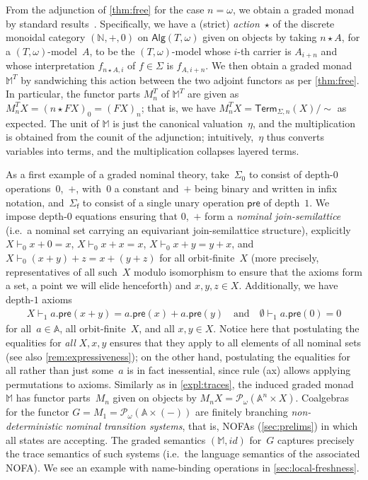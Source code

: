 \documentclass[a4paper,UKenglish,cleveref,thm-restate,numberwithinsect,final]{lipics-v2021}
\newcommand{\pre}{\mathsf{pre}}
\newcommand{\Alg}{\mathsf{Alg}}
\newcommand{\Term}{\mathsf{Term}}
\newcommand{\sig}{\Sigma}
\newcommand{\sigp}{\Sigma_0}
\newcommand{\sigf}{\Sigma_{\mathsf f}}
\newcommand{\Names}{\mathbb{A}}
\newcommand{\pow}{\mathcal{P}}
\newcommand{\powf}{\pow_{\omega}}
\theoremstyle{plain}
\newcommand{\id}{\mathit{id}}
\numberwithin{equation}{section}
\newcommand{\Nat}{{\mathbb{N}}}
\newcommand{\monad}{{\mathbb{M}}}
\newcommand{\+}[1]{\mathcal{#1}\xspace}
\theoremstyle{definition}
\begin{document}
\noindent From the adjunction of \cref{thm:free} for the case
$n=\omega$, we obtain a graded monad by standard
results~\cite[Section~3]{FujiiEA16}.  Specifically, we have a (strict) \emph{action}~$\star$
of the discrete monoidal category $(\Nat,+,0)$ on $\Alg(T,\omega)$
given on objects by taking $n\star A$, for a $(T,\omega)$-model~$A$,
to be the $(T,\omega)$-model whose $i$-th carrier is $A_{i+n}$ and whose
interpretation $f_{n\star A,i}$ of $f\in\sig$ is $f_{A,i+n}$. We then
obtain a graded monad $\monad^T$ by sandwiching this action between
the two adjoint functors as per \cref{thm:free}. In particular, the
functor parts $M^T_n$ of $\monad^T$ are given as
$M^T_nX=(n\star FX)_0=(FX)_n$; that is, we have $M^T_nX=\Term_{\Sigma,n}(X)/\sim$
as expected. The unit of $\monad$ is just the canonical
valuation~$\eta$, and the multiplication is obtained from the counit
of the adjunction; intuitively,~$\eta$ thus converts variables into
terms, and the multiplication collapses layered terms.


\begin{example}\label{expl:nominal-ts}
  As a first example of a graded nominal theory, take~$\sigp$ to
  consist of depth-$0$ operations~$0$,~$+$, with~$0$ a constant
  and~$+$ being binary and written in infix notation, and~$\sigf$ to
  consist of a single unary operation $\pre$ of depth~$1$. We impose
  depth-$0$ equations ensuring that $0$,~$+$ form a \emph{nominal join-semilattice} (i.e.~a nominal set carrying an equivariant
  join-semilattice structure), explicitly $X\vdash_0 x+0=x$,
  $X\vdash_0 x+x=x$, $X\vdash_0 x+y=y+x$, and
  $X\vdash_0 (x+y)+z=x+(y+z)$ for all orbit-finite~$X$ (more
  precisely, representatives of all such~$X$ modulo isomorphism to
  ensure that the axioms form a set, a point we will elide henceforth)
  and $x,y,z\in X$. Additionally, we have depth-$1$ axioms
  \begin{gather}
    X\vdash_1a.\pre(x+y)=a.\pre(x)+a.\pre(y)
    \quad\text{and}\quad
    \emptyset\vdash_1 a.\pre(0)=0\label{ax:distributivity-pre}
  \end{gather}
  for all~$a\in\Names$, all orbit-finite~$X$, and all $x,y\in X$.
  Notice here that postulating the equalities for \emph{all} $X,x,y$
  ensures that they apply to all elements of all nominal sets (see
  also \cref{rem:expressiveness}); on the other hand, postulating the
  equalities for all rather than just some~$a$ is in fact inessential,
  since rule (ax) allows applying permutations to axioms. Similarly as
  in \cref{expl:traces}, the induced graded monad~$\monad$ has functor
  parts~$M_n$ given on objects by $M_nX=\powf(\Names^n\times
  X)$. Coalgebras for the functor $G=M_1=\powf(\Names\times(-))$ are
  finitely branching \emph{non-deterministic nominal transition
    systems}, that is, NOFAs (\cref{sec:prelims}) in which all states
  are accepting. The graded semantics $(\monad,\id)$ for~$G$ captures
  precisely the trace semantics of such systems (i.e.\ the language
  semantics of the associated NOFA). We see an example with
  name-binding operations in \cref{sec:local-freshness}.
\end{example}
\end{document}
